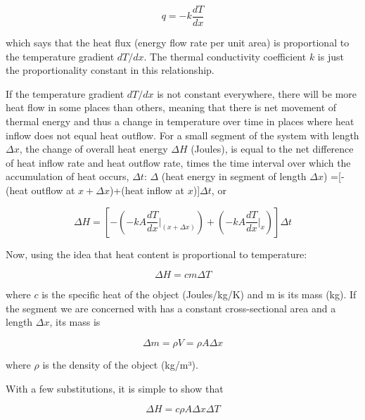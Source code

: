 \begin{equation} \label{eq:heatflux} 
q =-k\frac{dT}{dx}
\end{equation}

which says that the heat flux (energy flow rate per unit area) is proportional to the temperature gradient $dT/dx$.
The thermal conductivity coefficient $k$ is just the proportionality constant in this relationship.

If the temperature gradient $dT/dx$ is not constant everywhere, there will be more heat flow in some places than others, meaning that there is net movement of thermal energy and thus a change in temperature over time in places where heat inflow does not equal heat outflow.
For a small segment of the system with length $\Delta x$, the change of overall heat energy $\Delta H$ (Joules), is equal to the net difference of heat inflow rate and heat outflow rate, times the time interval over which the accumulation of heat occurs, $\Delta t$:
$\Delta$ (heat energy in segment of length $\Delta x$) =[-(heat outflow at $x+\Delta x$)+(heat inflow at $x$)]$\Delta t$, or

\begin{equation} \label{eq:deltah} 
\Delta H =\left[-\left(-kA \frac{dT}{dx}\bigg\rvert_{(x+\Delta x)}\right)+\left( -kA \frac{dT}{dx}\bigg\rvert_{x}\right)\right]\Delta t
\end{equation}

Now, using the idea that heat content is proportional to temperature: 

\begin{equation} \label{eq:heattransfer} 
\Delta H =cm\Delta T
\end{equation}

where $c$ is the specific heat of the object (Joules/kg/K) and m is its mass (kg).
If the segment we are concerned with has a constant cross-sectional area and a length $\Delta x$, its mass is 
	
\begin{equation} \label{eq:mass} 
\Delta m=\rho V = \rho A \Delta x
\end{equation}

where $\rho$ is the density of the object (kg/m³).

With a few substitutions, it is simple to show that 	

\begin{equation} \label{eq:deltaH2} 
\Delta H =c\rho A\Delta x \Delta T
\end{equation}


